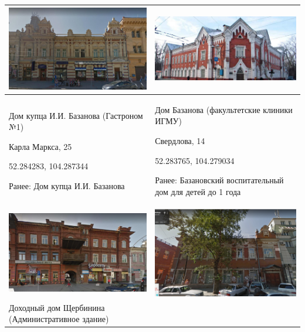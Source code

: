 \begin{longtable}{|p{8cm}|p{8cm}|}
    \hline
    \includegraphics[width=6.5cm]{2} & \includegraphics[width=8cm]{3} \\
    \hline
    Дом купца И.И. Базанова  (Гастроном №1)

    Карла Маркса, 25 
    
    52.284283, 104.287344
    
    Ранее: Дом купца И.И. Базанова & Дом Базанова (факультетские клиники ИГМУ) 

    Свердлова, 14 

    52.283765, 104.279034

    Ранее: Базановский воспитательный дом для детей до 1 года \\
    \hline
    \includegraphics[width=7cm]{4} & \includegraphics[width=6.5cm]{5} \\
    \hline
    Доходный дом Щербинина (Административное здание)


\end{longtable}
